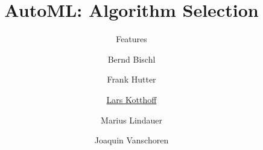 



\title[AutoML: Overview]{AutoML: Algorithm Selection} %
\subtitle{Features} %
\author[Marius Lindauer]{Bernd Bischl \and Frank Hutter \and \underline{Lars Kotthoff}\newline \and Marius Lindauer \and Joaquin Vanschoren}
\institute{}
\date{}




	
\maketitle

